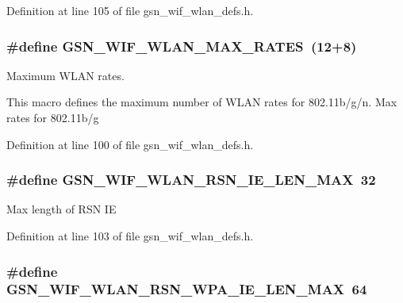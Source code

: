 Definition at line 105 of file gsn\_\-wif\_\-wlan\_\-defs.h.

\hypertarget{a00677_ga1bec540337ad0475486c1dcc1dd60aa2}{
\subsubsection[{GSN\_\-WIF\_\-WLAN\_\-MAX\_\-RATES}]{\setlength{\rightskip}{0pt plus 5cm}\#define GSN\_\-WIF\_\-WLAN\_\-MAX\_\-RATES~(12+8)}}
\label{a00677_ga1bec540337ad0475486c1dcc1dd60aa2}


Maximum WLAN rates. 

This macro defines the maximum number of WLAN rates for 802.11b/g/n. Max rates for 802.11b/g 

Definition at line 100 of file gsn\_\-wif\_\-wlan\_\-defs.h.

\hypertarget{a00677_ga275d137a8bc7f90a904a86cd30f7be8c}{
\subsubsection[{GSN\_\-WIF\_\-WLAN\_\-RSN\_\-IE\_\-LEN\_\-MAX}]{\setlength{\rightskip}{0pt plus 5cm}\#define GSN\_\-WIF\_\-WLAN\_\-RSN\_\-IE\_\-LEN\_\-MAX~32}}
\label{a00677_ga275d137a8bc7f90a904a86cd30f7be8c}
Max length of RSN IE 

Definition at line 103 of file gsn\_\-wif\_\-wlan\_\-defs.h.

\hypertarget{a00677_gad043f51474c04cc30a14d7d36d0d38f4}{
\subsubsection[{GSN\_\-WIF\_\-WLAN\_\-RSN\_\-WPA\_\-IE\_\-LEN\_\-MAX}]{\setlength{\rightskip}{0pt plus 5cm}\#define GSN\_\-WIF\_\-WLAN\_\-RSN\_\-WPA\_\-IE\_\-LEN\_\-MAX~64}}
\label{a00677_gad043f51474c04cc30a14d7d36d0d38f4}


